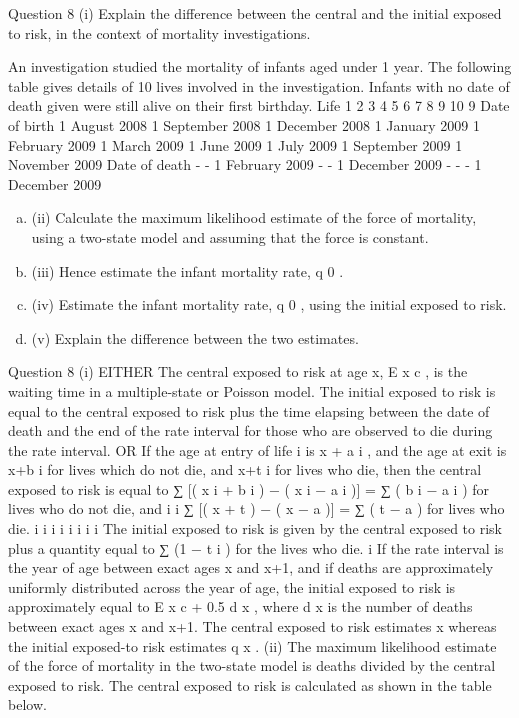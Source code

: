\documentclass[a4paper,12pt]{article}
\begin{document}
\begin{enumerate}
Question 8
(i)
Explain the difference between the central and the initial exposed to
risk, in the context of mortality investigations.

An investigation studied the mortality of infants aged under 1 year. The following table gives details of 10 lives involved in the investigation. Infants with no date of
death given were still alive on their first birthday.
Life
1
2
3
4
5
6
7
8
9
10
9
Date of birth
1 August 2008
1 September 2008
1 December 2008
1 January 2009
1 February 2009
1 March 2009
1 June 2009
1 July 2009
1 September 2009
1 November 2009
Date of death
-
-
1 February 2009
-
-
1 December 2009
-
-
-
1 December 2009

\begin{enumerate}[(a)]
\item (ii) Calculate the maximum likelihood estimate of the force of mortality, using a
two-state model and assuming that the force is constant.
\item 
(iii) Hence estimate the infant mortality rate, q 0 .
\item 
(iv) Estimate the infant mortality rate, q 0 , using the initial exposed to risk.
\item 
(v) Explain the difference between the two estimates.
\end{enumerate}
\newpage

Question 8
(i)
EITHER
The central exposed to risk at age x, E x c , is the waiting time in a multiple-state or
Poisson model.
The initial exposed to risk is equal to the central exposed to risk plus the time elapsing
between the date of death and the end of the rate interval for those who are observed
to die during the rate interval.
OR
If the age at entry of life i is x + a i , and the age at exit is x+b i for lives which do not
die, and x+t i for lives who die, then the central exposed to risk is equal to
∑ [( x i + b i ) − ( x i − a i )] = ∑ ( b i − a i ) for lives who do not die, and
i
i
∑ [( x + t ) − ( x − a )] = ∑ ( t − a ) for lives who die.
i
i
i
i
i
i
i
i
The initial exposed to risk is given by the central exposed to risk plus a quantity equal
to ∑ (1 − t i ) for the lives who die.
i
If the rate interval is the year of age between exact ages x and x+1, and if deaths are
approximately uniformly distributed across the year of age, the initial exposed to risk
is approximately equal to E x c + 0.5 d x , where d x is the number of deaths between exact
ages x and x+1.
The central exposed to risk estimates \mu x whereas the initial exposed-to risk estimates
q x .
(ii)
The maximum likelihood estimate of the force of mortality in the two-state model is
deaths divided by the central exposed to risk.
The central exposed to risk is calculated as shown in the table below.


\end{enumerate}
\end{document}

